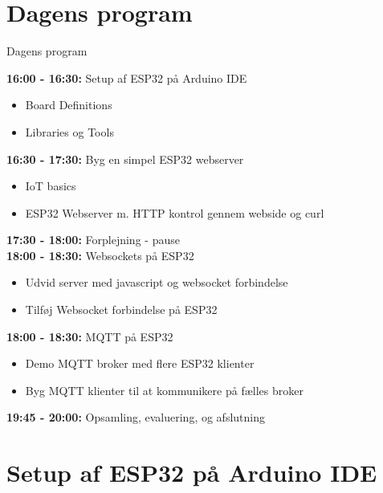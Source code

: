 \documentclass[aspectratio=169]{beamer}
\begin{document}
\section{Dagens program}
\begin{frame}{Dagens program}
	\begin{textBox}
		\textbf{16:00 - 16:30:} Setup af ESP32 på Arduino IDE
		\begin{itemize}
			\item Board Definitions
			\item Libraries og Tools
		\end{itemize}
		\textbf{16:30 - 17:30:} Byg en simpel ESP32 webserver
		\begin{itemize}
			\item IoT basics
			\item ESP32 Webserver m. HTTP kontrol gennem webside og curl
		\end{itemize}
		\textbf{17:30 - 18:00:} Forplejning - pause\\
		\textbf{18:00 - 18:30:} Websockets på ESP32
		\begin{itemize}
			\item Udvid server med javascript og websocket forbindelse
			\item Tilføj Websocket forbindelse på ESP32
		\end{itemize}
		\textbf{18:00 - 18:30:} MQTT på ESP32
		\begin{itemize}
			\item Demo MQTT broker med flere ESP32 klienter
			\item Byg MQTT klienter til at kommunikere på fælles broker
		\end{itemize}
		\textbf{19:45 - 20:00:} Opsamling, evaluering, og afslutning
	\end{textBox}
\end{frame}

\section{Setup af ESP32 på Arduino IDE}
\begin{frame}
\end{frame}
\end{document}
